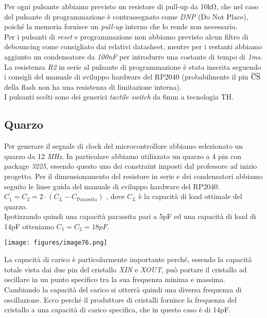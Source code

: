 \noindent Per ogni pulsante abbiamo previsto un resistore di pull-up da 10kΩ, che
nel caso del pulsante di programmazione è contrassegnato come \emph{DNP}
(Do Not Place), poiché la memoria fornisce un \emph{pull-up} interno che
lo rende non necessario.\\
Per i pulsanti di \emph{reset} e programmazione non abbiamo previsto
alcun filtro di debouncing come consigliato dai relativi datasheet,
mentre per i restanti abbiamo aggiunto un condensatore da \emph{100nF}
per introdurre una costante di tempo di \emph{1ms}.\\
La resistenza \emph{R2} in serie al pulsante di programmazione è stata inserita
seguendo i consigli del manuale di sviluppo hardware del RP2040
(probabilmente il pin $\overline{\rm {CS}}$ della flash non ha una
resistenza di limitazione interna).\\
I pulsanti scelti sono dei generici \emph{tactile switch} da 6mm a
tecnologia TH.

\hypertarget{quarzo}{%
\subsection{Quarzo}\label{quarzo}}

Per generare il segnale di clock del microcontrollore abbiamo
selezionato un quarzo da 12 \emph{MHz}. In particolare abbiamo
utilizzato un quarzo a 4 pin con package \emph{3225}, essendo questo uno
dei constraint imposti dal professore ad inizio progetto. Per il
dimensionamento del resistore in serie e dei condensatori abbiamo
seguito le linee guida del manuale di sviluppo hardware del RP2040.\\
\(C_{1} = C_{2} = 2 \cdot (C_{L} - C_{\text{Parassita}})\)
, dove \(C_{L}\) è la capacità di load ottimale del quarzo.\\
Ipotizzando quindi una capacità parassita pari a 5pF ed una capacità di
load di 14pF otteniamo \(C_{1} = C_{2} =18pF\).

\begin{center}
\texttt{[image: figures/image76.png]}
\captionsetup{type=figure}
\end{center}

\noindent La capacità di carico è particolarmente importante perché, essendo la
capacità totale vista dai due pin del cristallo \emph{XIN} e \emph{XOUT}, può portare
il cristallo ad oscillare in un punto specifico tra la sua frequenza
minima e massima. Cambiando la capacità del carico si otterrà quindi una
diversa frequenza di oscillazione. Ecco perché il produttore di
cristalli fornisce la frequenza del cristallo a una capacità di carico
specifica, che in questo caso è di 14pF.

